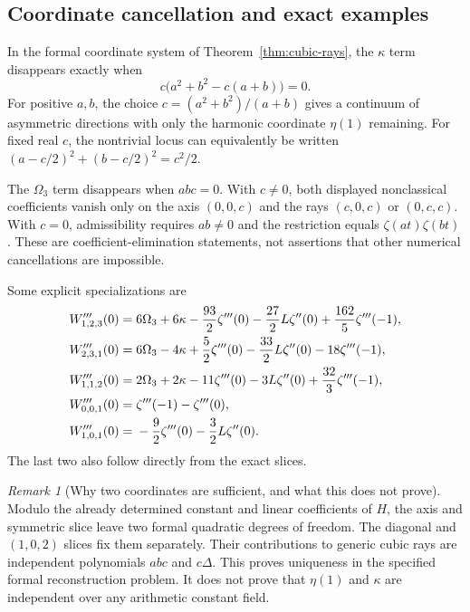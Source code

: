 \documentclass[11pt]{article}
\numberwithin{equation}{section}
\theoremstyle{definition}
\theoremstyle{remark}
\newtheorem{remark}[theorem]{Remark}
\begin{document}
\subsection{Coordinate cancellation and exact examples}

In the formal coordinate system of Theorem~\ref{thm:cubic-rays},
the $\kappa$ term disappears exactly when
\begin{equation}\label{ray:conic}
 c\bigl(a^2+b^2-c(a+b)\bigr)=0.
\end{equation}
For positive $a,b$, the choice
$c=(a^2+b^2)/(a+b)$ gives a continuum of asymmetric directions with
only the harmonic coordinate $\eta(1)$ remaining. For fixed real
$c$, the nontrivial locus can equivalently be written
$(a-c/2)^2+(b-c/2)^2=c^2/2$.

The $\Omega_3$ term disappears when $abc=0$. With $c\ne0$, both
displayed nonclassical coefficients vanish only on the axis
$(0,0,c)$ and the rays $(c,0,c)$ or $(0,c,c)$. With $c=0$,
admissibility requires $ab\ne0$ and the restriction equals
$\zeta(at)\zeta(bt)$. These are coefficient-elimination statements,
not assertions that other numerical cancellations are impossible.

Some explicit specializations are
\begin{align}
 W_{1,2,3}'''(0)={}&6\Omega_3+6\kappa
       -\frac{93}{2}\zeta'''(0)-\frac{27}{2}L\zeta''(0)
       +\frac{162}{5}\zeta'''(-1),\label{ray:123}\\
 W_{2,3,1}'''(0)={}&6\Omega_3-4\kappa
       +\frac52\zeta'''(0)-\frac{33}{2}L\zeta''(0)
       -18\zeta'''(-1),\label{ray:231}\\
 W_{1,1,2}'''(0)={}&2\Omega_3+2\kappa
       -11\zeta'''(0)-3L\zeta''(0)+\frac{32}{3}\zeta'''(-1),\notag\\
 W_{0,0,1}'''(0)={}&\zeta'''(-1)-\zeta'''(0),\notag\\
 W_{1,0,1}'''(0)={}&-\frac92\zeta'''(0)-\frac32L\zeta''(0).
\end{align}
The last two also follow directly from the exact slices.

\begin{remark}[Why two coordinates are sufficient, and what this does not prove]
Modulo the already determined constant and linear coefficients of
$H$, the axis and symmetric slice leave two formal quadratic degrees
of freedom. The diagonal and $(1,0,2)$ slices fix them separately.
Their contributions to generic cubic rays are independent polynomials
$abc$ and $c\Delta$. This proves uniqueness in the specified formal
reconstruction problem. It does not prove that $\eta(1)$ and $\kappa$
are independent over any arithmetic constant field.
\end{remark}
\end{document}
